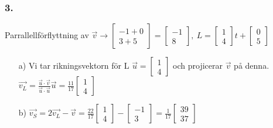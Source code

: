 \documentclass{article}
\begin{document}
\subsubsection*{3.}
Parrallellförflyttning av $\vec{v} \to \begin{bmatrix}-1+0 \\ 3+5\end{bmatrix}=\begin{bmatrix}-1 \\ 8\end{bmatrix},\ L=\begin{bmatrix}1 \\ 4\end{bmatrix}t+\begin{bmatrix}0 \\ 5\end{bmatrix}$
\begin{itemize}
\item[a) ] Vi tar rikningsvektorn för L $\vec{u}=\begin{bmatrix}1 \\ 4\end{bmatrix}$ och projicerar $\vec{v}$ på denna. $\vec{v_{L}}=\frac{\vec{u}\cdot\vec{v}}{\vec{u}\cdot\vec{u}}\vec{u}=\frac{11}{17}\begin{bmatrix}1 \\ 4 \end{bmatrix}$
\item[b) ] $\vec{v_{S}}=2\vec{v_{L}}-\vec{v}= \frac{22}{17}\begin{bmatrix}1 \\ 4 \end{bmatrix}- \begin{bmatrix}-1 \\ 3 \end{bmatrix} =\frac{1}{17} \begin{bmatrix} 39 \\ 37\end{bmatrix}$
\end{itemize}
\end{document}

